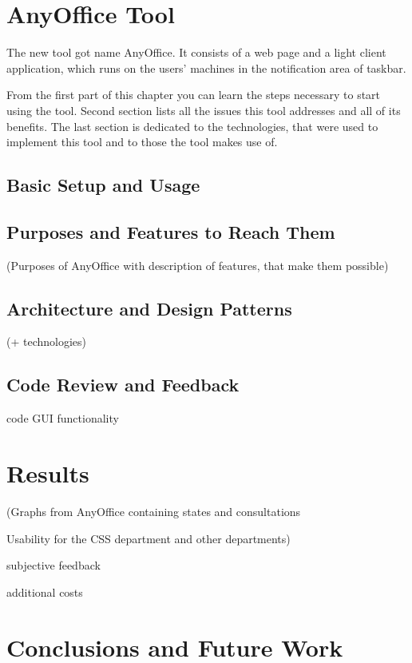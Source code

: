 \documentclass[11pt,singleside]{myfithesis2}
\begin{document}
\chapter{AnyOffice Tool}

The new tool got name AnyOffice. It consists of a web page and a light client application, which runs on the users' machines in the notification area of taskbar.

From the first part of this chapter you can learn the steps necessary to start using the tool. Second section lists all the issues this tool addresses and all of its benefits. The last section is dedicated to the technologies, that were used to implement this tool and to those the tool makes use of.


	\section{Basic Setup and Usage}



	\section{Purposes and Features to Reach Them}
(Purposes of AnyOffice with description of features, that make them possible)

	
	\section{Architecture and Design Patterns}
	(+ technologies)
	
	\section{Code Review and Feedback}

code
GUI
functionality


\chapter{Results}
(Graphs from AnyOffice containing states and consultations

Usability for the CSS department and other departments)

subjective feedback

additional costs


\chapter{Conclusions and Future Work}
\end{document}
